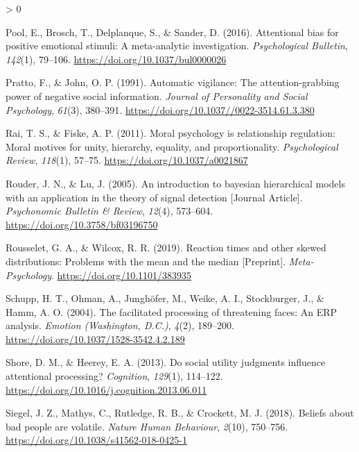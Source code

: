\documentclass[
  english,
  man]{apa6}
\newlength{\cslhangindent}
\newenvironment{CSLReferences}[2] %
 {%
  \setlength{\parindent}{0pt}
  \ifodd #1 \everypar{\setlength{\hangindent}{\cslhangindent}}\ignorespaces\fi
  \ifnum #2 > 0
  \setlength{\parskip}{#2\baselineskip}
  \fi
 }%
 {}
\begin{document}
\begin{CSLReferences}{1}{0}
\leavevmode\hypertarget{ref-pool_attentional_2016}{}%
Pool, E., Brosch, T., Delplanque, S., \& Sander, D. (2016). Attentional bias for positive emotional stimuli: A meta-analytic investigation. \emph{Psychological Bulletin}, \emph{142}(1), 79--106. \url{https://doi.org/10.1037/bul0000026}

\leavevmode\hypertarget{ref-pratto_automatic_1991}{}%
Pratto, F., \& John, O. P. (1991). Automatic vigilance: The attention-grabbing power of negative social information. \emph{Journal of Personality and Social Psychology}, \emph{61}(3), 380--391. \url{https://doi.org/10.1037//0022-3514.61.3.380}

\leavevmode\hypertarget{ref-rai_moral_2011}{}%
Rai, T. S., \& Fiske, A. P. (2011). Moral psychology is relationship regulation: Moral motives for unity, hierarchy, equality, and proportionality. \emph{Psychological Review}, \emph{118}(1), 57--75. \url{https://doi.org/10.1037/a0021867}

\leavevmode\hypertarget{ref-Rouder_2005_BHM_SDT}{}%
Rouder, J. N., \& Lu, J. (2005). An introduction to bayesian hierarchical models with an application in the theory of signal detection {[}Journal Article{]}. \emph{Psychonomic Bulletin \& Review}, \emph{12}(4), 573--604. \url{https://doi.org/10.3758/bf03196750}

\leavevmode\hypertarget{ref-Rousselet_2019}{}%
Rousselet, G. A., \& Wilcox, R. R. (2019). Reaction times and other skewed distributions: Problems with the mean and the median {[}Preprint{]}. \emph{Meta-Psychology}. \url{https://doi.org/10.1101/383935}

\leavevmode\hypertarget{ref-schupp_facilitated_2004}{}%
Schupp, H. T., Ohman, A., Junghöfer, M., Weike, A. I., Stockburger, J., \& Hamm, A. O. (2004). The facilitated processing of threatening faces: An {ERP} analysis. \emph{Emotion (Washington, D.C.)}, \emph{4}(2), 189--200. \url{https://doi.org/10.1037/1528-3542.4.2.189}

\leavevmode\hypertarget{ref-shore_social_2013}{}%
Shore, D. M., \& Heerey, E. A. (2013). Do social utility judgments influence attentional processing? \emph{Cognition}, \emph{129}(1), 114--122. \url{https://doi.org/10.1016/j.cognition.2013.06.011}

\leavevmode\hypertarget{ref-siegel_beliefs_2018}{}%
Siegel, J. Z., Mathys, C., Rutledge, R. B., \& Crockett, M. J. (2018). Beliefs about bad people are volatile. \emph{Nature Human Behaviour}, \emph{2}(10), 750--756. \url{https://doi.org/10.1038/s41562-018-0425-1}


\end{CSLReferences}
\end{document}
